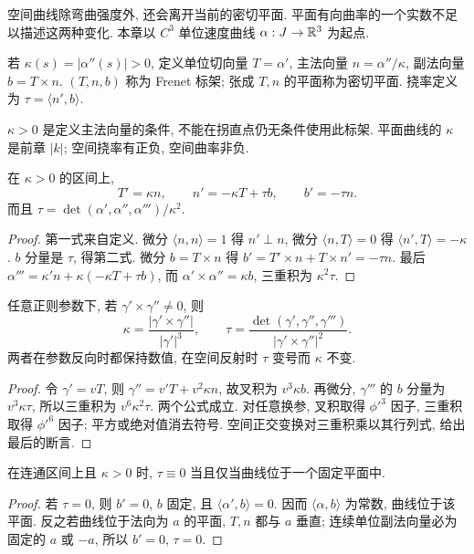 空间曲线除弯曲强度外, 还会离开当前的密切平面. 平面有向曲率的一个实数不足以描述这两种变化. 本章以 $C^3$ 单位速度曲线 $\alpha:J\to\mathbb R^3$ 为起点.
\begin{definition}
若 $\kappa(s)=|\alpha''(s)|>0$, 定义单位切向量 $T=\alpha'$, 主法向量 $n=\alpha''/\kappa$, 副法向量 $b=T\times n$. $(T,n,b)$ 称为 Frenet 标架; 张成 $T,n$ 的平面称为密切平面. 挠率定义为 $\tau=\langle n',b\rangle$.
\end{definition}
$\kappa>0$ 是定义主法向量的条件, 不能在拐直点仍无条件使用此标架. 平面曲线的 $\kappa$ 是前章 $|k|$; 空间挠率有正负, 空间曲率非负.
\begin{theorem}\label{thm:space-frenet}
在 $\kappa>0$ 的区间上,
\begin{equation}\label{eq:frenet3}
 T'=\kappa n,\qquad n'=-\kappa T+\tau b,\qquad b'=-\tau n.
\end{equation}
而且 $\tau=\det(\alpha',\alpha'',\alpha''')/\kappa^2$.
\end{theorem}
\begin{proof}
第一式来自定义. 微分 $\langle n,n\rangle=1$ 得 $n'\perp n$, 微分 $\langle n,T\rangle=0$ 得 $\langle n',T\rangle=-\kappa$. $b$ 分量是 $\tau$, 得第二式. 微分 $b=T\times n$ 得 $b'=T'\times n+T\times n'=-\tau n$. 最后 $\alpha'''=\kappa'n+\kappa(-\kappa T+\tau b)$, 而 $\alpha'\times\alpha''=\kappa b$, 三重积为 $\kappa^2\tau$.
\end{proof}
\begin{proposition}\label{prop:space-param}
任意正则参数下, 若 $\gamma'\times\gamma''\ne0$, 则
\[
 \kappa=\frac{|\gamma'\times\gamma''|}{|\gamma'|^3},\qquad
 \tau=\frac{\det(\gamma',\gamma'',\gamma''')}{|\gamma'\times\gamma''|^2}.
\]
两者在参数反向时都保持数值, 在空间反射时 $\tau$ 变号而 $\kappa$ 不变.
\end{proposition}
\begin{proof}
令 $\gamma'=vT$, 则 $\gamma''=v'T+v^2\kappa n$, 故叉积为 $v^3\kappa b$. 再微分, $\gamma'''$ 的 $b$ 分量为 $v^3\kappa\tau$, 所以三重积为 $v^6\kappa^2\tau$. 两个公式成立. 对任意换参, 叉积取得 $\phi'^3$ 因子, 三重积取得 $\phi'^6$ 因子; 平方或绝对值消去符号. 空间正交变换对三重积乘以其行列式, 给出最后的断言.
\end{proof}
\begin{proposition}
在连通区间上且 $\kappa>0$ 时, $\tau\equiv0$ 当且仅当曲线位于一个固定平面中.
\end{proposition}
\begin{proof}
若 $\tau=0$, 则 $b'=0$, $b$ 固定, 且 $\langle\alpha',b\rangle=0$. 因而 $\langle\alpha,b\rangle$ 为常数, 曲线位于该平面. 反之若曲线位于法向为 $a$ 的平面, $T,n$ 都与 $a$ 垂直; 连续单位副法向量必为固定的 $a$ 或 $-a$, 所以 $b'=0$, $\tau=0$.
\end{proof}
